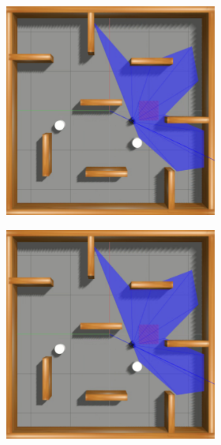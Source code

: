 \begin{figure}[H]
\begin{center}
\begin{subfigure}[b]{0.60\textwidth}
\begin{subfigure}[b]{0.24\textwidth}
        \end{subfigure}
        \hfill
        \begin{subfigure}[b]{0.24\textwidth}
            \includegraphics[width=\textwidth]{imagens/simulated_envs/sim_env3_sac/7.png}
        \end{subfigure}
        \hfill
        \begin{subfigure}[b]{0.24\textwidth}
            \includegraphics[width=\textwidth]{imagens/simulated_envs/sim_env3_sac/7.png}

\end{subfigure}
\end{subfigure}
\end{center}
\end{figure}

